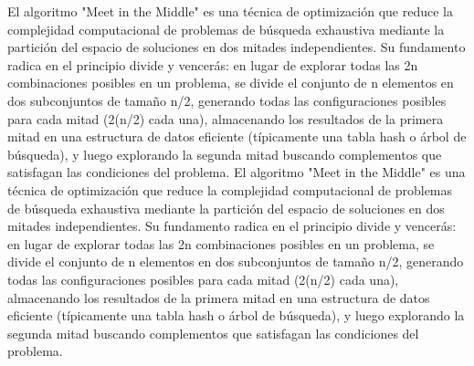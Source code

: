 \markdownRendererDocumentBegin
\markdownRendererSectionBegin
{}\markdownRendererInterblockSeparator
{}El algoritmo "Meet in the Middle" es una técnica de optimización que reduce la complejidad computacional de problemas de búsqueda exhaustiva mediante la partición del espacio de soluciones en dos mitades independientes. Su fundamento radica en el principio divide y vencerás: en lugar de explorar todas las \markdownRendererDollarSign{}2\markdownRendererCircumflex{}n\markdownRendererDollarSign{} combinaciones posibles en un problema, se divide el conjunto de n elementos en dos subconjuntos de tamaño n/2, generando todas las configuraciones posibles para cada mitad (\markdownRendererDollarSign{}2\markdownRendererCircumflex{}(n/2)\markdownRendererDollarSign{} cada una), almacenando los resultados de la primera mitad en una estructura de datos eficiente (típicamente una tabla hash o árbol de búsqueda), y luego explorando la segunda mitad buscando complementos que satisfagan las condiciones del problema.\markdownRendererInterblockSeparator
{}
\markdownRendererSectionEnd \markdownRendererDocumentEnd\markdownRendererDocumentBegin
\markdownRendererSectionBegin
{}\markdownRendererInterblockSeparator
{}El algoritmo "Meet in the Middle" es una técnica de optimización que reduce la complejidad computacional de problemas de búsqueda exhaustiva mediante la partición del espacio de soluciones en dos mitades independientes. Su fundamento radica en el principio divide y vencerás: en lugar de explorar todas las \markdownRendererDollarSign{}2\markdownRendererCircumflex{}n\markdownRendererDollarSign{} combinaciones posibles en un problema, se divide el conjunto de n elementos en dos subconjuntos de tamaño n/2, generando todas las configuraciones posibles para cada mitad (\markdownRendererDollarSign{}2\markdownRendererCircumflex{}(n/2)\markdownRendererDollarSign{} cada una), almacenando los resultados de la primera mitad en una estructura de datos eficiente (típicamente una tabla hash o árbol de búsqueda), y luego explorando la segunda mitad buscando complementos que satisfagan las condiciones del problema.\markdownRendererInterblockSeparator
{}
\markdownRendererSectionEnd \markdownRendererDocumentEnd